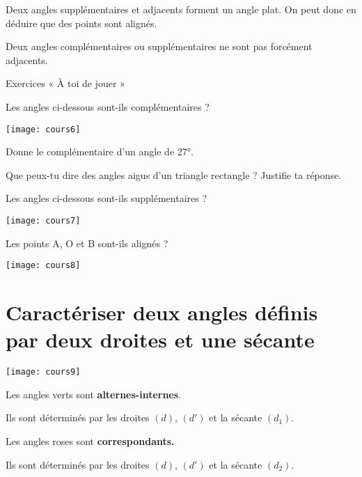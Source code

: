 \begin{remarque}
Deux angles supplémentaires et adjacents forment un angle plat. On peut donc en déduire que des points sont alignés.
\end{remarque}

\begin{remarque}
Deux angles complémentaires ou supplémentaires ne sont pas forcément adjacents.
\end{remarque}

\vspace{1em}

Exercices « À toi de jouer »

Les angles ci-dessous sont-ils complémentaires ?

\begin{center}
    \texttt{[image: cours6]}
\end{center}

Donne le complémentaire d'un angle de 27°.

Que peux-tu dire des angles aigus d'un triangle rectangle ? Justifie ta réponse.


Les angles ci-dessous sont-ils supplémentaires ?
\begin{center}
    \texttt{[image: cours7]}
\end{center}


Les points A, O et B sont-ils alignés ?
\begin{center}
    \texttt{[image: cours8]}
\end{center}







\section{Caractériser deux angles définis par deux droites et une sécante}


\begin{aconnaitre}
\begin{minipage}{.3\linewidth}
\centering
\texttt{[image: cours9]}
\end{minipage}\hfill%
\begin{minipage}{.67\linewidth}
Les angles verts sont \textbf{alternes-internes}.

Ils sont déterminés par les droites $(d)$, $(d')$ et la sécante $(d_1)$.

Les angles roses sont \textbf{correspondants.}

Ils sont déterminés par les droites $(d)$, $(d')$ et la sécante $(d_2)$.
\end{minipage}
\end{aconnaitre}

